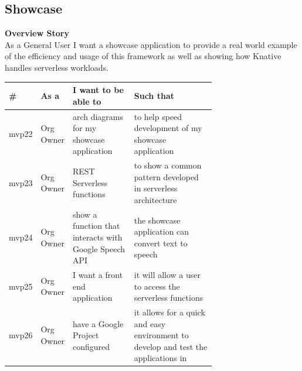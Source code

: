 \subsection{Showcase}
\label{sub:showcasesto}
\textbf{Overview Story}
\\As a General User I want a showcase application to provide a real world example of the efficiency and usage of this framework as well as showing how Knative handles serverless workloads.

\begin{table}[!ht]
\begin{tabular}{|l|l|p{0.3\linewidth}|p{0.4\linewidth}|}
\hline
\textbf{\#} & \textbf{As a} & \textbf{I want to be able to}                         & \textbf{Such that}                                                                 \\ \hline
mvp22       & Org Owner     & arch diagrams for my showcase application             & to help speed development of my showcase application                               \\ \hline
mvp23       & Org Owner     & REST Serverless functions                             & to show a common pattern developed in serverless architecture                      \\ \hline
mvp24       & Org Owner     & show a function that interacts with Google Speech API & the showcase application can convert text to speech                                \\ \hline
mvp25       & Org Owner     & I want a front end application                        & it will allow a user to access the serverless functions                            \\ \hline
mvp26       & Org Owner     & have a Google Project configured                      & it allows for a quick and easy environment to develop and test the applications in \\ \hline
\end{tabular}
\end{table}

\clearpage
